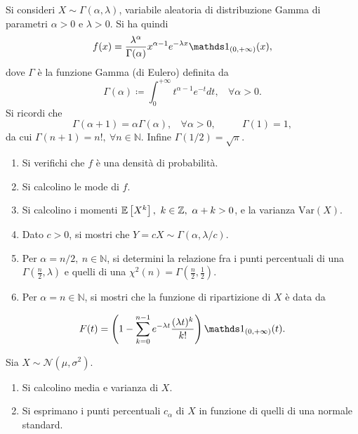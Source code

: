 Si consideri $X\sim \Gamma ( \alpha ,\lambda )$, variabile aleatoria di distribuzione Gamma di parametri $\alpha  >0$ e $\lambda  >0$. Si ha quindi
\begin{equation*}
f( x) =\frac{\lambda ^{\alpha }}{\Gamma ( \alpha )} x^{\alpha -1} e^{-\lambda x} \Ind_{( 0,+\infty )}( x) ,
\end{equation*}
dove $\Gamma $ è la funzione Gamma (di Eulero) definita da
\begin{equation*}
\Gamma ( \alpha ) \coloneqq \int _{0}^{+\infty } t^{\alpha -1} e^{-t} dt,\ \ \ \ \forall \alpha  >0.
\end{equation*}
Si ricordi che
\begin{equation*}
\Gamma ( \alpha +1) =\alpha \Gamma ( \alpha ) ,\ \ \ \ \forall \alpha  >0,\ \ \ \ \ \ \ \ \ \ \ \ \Gamma ( 1) =1,
\end{equation*}
da cui $\Gamma ( n+1) =n!,\ \forall n\in \mathbb{N}$. Infine $\Gamma ( 1/2) =\sqrt{\pi }$.
\begin{enumerate}
\item Si verifichi che $f$ è una densità di probabilità.
\item Si calcolino le mode di $f$.
\item Si calcolino i momenti $\mathbb{E}\left[ X^{k}\right] ,\ k\in \mathbb{Z} ,\ \alpha +k >0$, e la varianza $\mathrm{Var}( X)$.
\item Dato $c >0$, si mostri che $Y=cX\sim \Gamma ( \alpha ,\lambda /c)$.
\item Per $\alpha =n/2,\ n\in \mathbb{N}$, si determini la relazione fra i punti percentuali di una $\Gamma \left(\frac{n}{2} ,\lambda \right)$ e quelli di una $\chi ^{2}( n) =\Gamma \left(\frac{n}{2} ,\frac{1}{2}\right)$.
\item Per $\alpha =n\in \mathbb{N}$, si mostri che la funzione di ripartizione di $X$ è data da
\end{enumerate}
\begin{equation*}
F( t) =\left( 1-\sum\limits _{k=0}^{n-1} e^{-\lambda t}\frac{( \lambda t)^{k}}{k!}\right) \Ind_{( 0,+\infty )}( t) .
\end{equation*}

Sia $X\sim \mathcal{N}\left( \mu ,\sigma ^{2}\right)$.
\begin{enumerate}
\item Si calcolino media e varianza di $X$.
\item Si esprimano i punti percentuali $c_{\alpha }$ di $X$ in funzione di quelli di una normale standard.
\end{enumerate}

